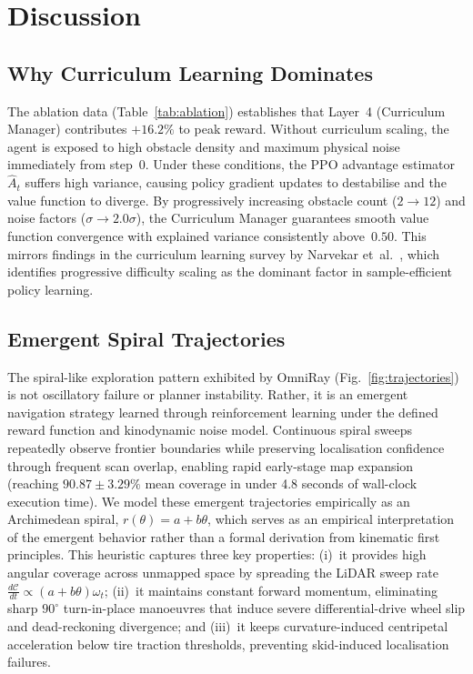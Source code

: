 \documentclass[conference]{IEEEtran}
\begin{document}
\section{Discussion}

\subsection{Why Curriculum Learning Dominates}
The ablation data (Table~\ref{tab:ablation}) establishes that Layer~4 (Curriculum Manager) contributes $+16.2\%$ to peak reward.
Without curriculum scaling, the agent is exposed to high obstacle density and maximum physical noise immediately from step~0.
Under these conditions, the PPO advantage estimator~$\hat{A}_t$ suffers high variance, causing policy gradient updates to destabilise and the value function to diverge.
By progressively increasing obstacle count ($2 \to 12$) and noise factors ($\sigma \to 2.0\sigma$), the Curriculum Manager guarantees smooth value function convergence with explained variance consistently above~$0.50$.
This mirrors findings in the curriculum learning survey by Narvekar et~al.~\cite{narvekar2020}, which identifies progressive difficulty scaling as the dominant factor in sample-efficient policy learning.

\subsection{Emergent Spiral Trajectories}
The spiral-like exploration pattern exhibited by OmniRay (Fig.~\ref{fig:trajectories}) is not oscillatory failure or planner instability.
Rather, it is an emergent navigation strategy learned through reinforcement learning under the defined reward function and kinodynamic noise model.
Continuous spiral sweeps repeatedly observe frontier boundaries while preserving localisation confidence through frequent scan overlap, enabling rapid early-stage map expansion (reaching $90.87 \pm 3.29\%$ mean coverage in under 4.8 seconds of wall-clock execution time).
We model these emergent trajectories empirically as an Archimedean spiral, $r(\theta) = a + b\theta$, which serves as an empirical interpretation of the emergent behavior rather than a formal derivation from kinematic first principles. This heuristic captures three key properties:
(i)~it provides high angular coverage across unmapped space by spreading the LiDAR sweep rate $\frac{d\mathcal{C}}{dt} \propto (a + b\theta)\omega_t$;
(ii)~it maintains constant forward momentum, eliminating sharp $90^\circ$ turn-in-place manoeuvres that induce severe differential-drive wheel slip and dead-reckoning divergence; and
(iii)~it keeps curvature-induced centripetal acceleration below tire traction thresholds, preventing skid-induced localisation failures.
\end{document}
